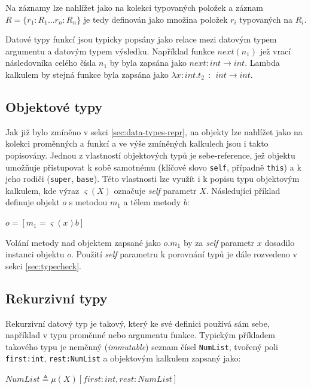 \documentclass[czech,DP]{thesiskiv}
\begin{document}
Na záznamy lze nahlížet jako na kolekci typovaných položek a záznam $R = \{r_1:R_1 ... r_n:R_n\}$ je tedy definován jako množina položek $r_i$ typovaných na $R_i$.

Datové typy funkcí jsou typicky popsány jako relace mezi datovým typem argumentu a datovým typem výsledku. Například funkce $next(n_1)$ jež vrací následovníka celého čísla $n_1$ by byla zapsána jako $next: int \rightarrow int$. Lambda kalkulem by stejná funkce byla zapsána jako $\lambda x:int.t_2\:\::\:\: int \rightarrow int$.

\subsection{Objektové typy}

Jak již bylo zmíněno v sekci \ref{sec:data-types-repr}, na objekty lze nahlížet jako na kolekci proměnných a funkcí a ve výše zmíněných kalkulech jsou i takto popisovány. Jednou z vlastností objektových typů je sebe-reference, jež objektu umožňuje přistupovat k sobě samotnému (klíčové slovo \verb|self|, případně \verb|this|) a k jeho rodiči (\verb|super|, \verb|base|). Této vlastnosti lze využít i k popisu typu objektovým kalkulem, kde výraz $\varsigma(X)$ označuje \textit{self} parametr $X$. Následující příklad definuje objekt $o$ s metodou $m_1$ a tělem metody $b$:

\begin{math}
o = [m_1=\varsigma(x)b]
\end{math}

Volání metody nad objektem zapsané jako $o.m_1$ by za \textit{self} parametr $x$ dosadilo instanci objektu $o$. Použití \textit{self} parametru k porovnání typů je dále rozvedeno v sekci \ref{sec:typecheck}. 


\subsection{Rekurzivní typy}

Rekurzivní datový typ je takový, který ke své definici používá sám sebe, například v typu proměnné nebo argumentu funkce. Typickým příkladem takového typu je neměnný (\textit{immutable}) seznam čísel \verb|NumList|, tvořený poli \verb|first:int|, \verb|rest:NumList| a objektovým kalkulem zapsaný jako:

\begin{math}
	NumList \triangleq \mu(X)[first:int, rest:NumList]
\end{math}
\end{document}
